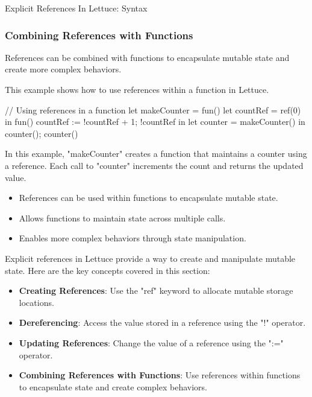 \begin{notes}{Explicit References In Lettuce: Syntax}
\begin{highlight}
    \end{highlight}
    
    \subsubsection*{Combining References with Functions}
    
    References can be combined with functions to encapsulate mutable state and create more complex behaviors.
    
    \begin{highlight}
    
        This example shows how to use references within a function in Lettuce.
    
    \begin{code}[Lettuce]
    // Using references in a function
    let makeCounter = fun() {
        let countRef = ref(0) in
        fun() {
            countRef := !countRef + 1;
            !countRef
        }
    } in
    let counter = makeCounter() in
    counter(); counter()
    \end{code}
    
        In this example, "makeCounter" creates a function that maintains a counter using a reference. Each call to "counter" increments the count and returns the updated value.
    
        \begin{itemize}
            \item References can be used within functions to encapsulate mutable state.
            \item Allows functions to maintain state across multiple calls.
            \item Enables more complex behaviors through state manipulation.
        \end{itemize}
    
    \end{highlight}
    
    \begin{highlight}
    
        Explicit references in Lettuce provide a way to create and manipulate mutable state. Here are the key concepts covered in this section:
    
        \begin{itemize}
            \item \textbf{Creating References}: Use the "ref" keyword to allocate mutable storage locations.
            \item \textbf{Dereferencing}: Access the value stored in a reference using the "!" operator.
            \item \textbf{Updating References}: Change the value of a reference using the ":=" operator.
            \item \textbf{Combining References with Functions}: Use references within functions to encapsulate state and create complex behaviors.
        \end{itemize}
    

\end{highlight}
\end{notes}
